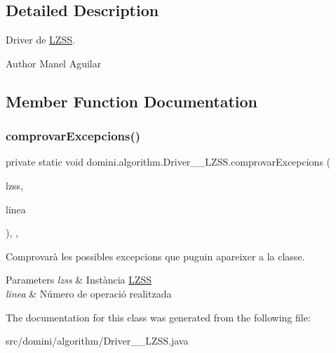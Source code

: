 \subsection{Detailed Description}
Driver de \hyperlink{classdomini_1_1algorithm_1_1LZSS}{L\+Z\+SS}. 

\begin{DoxyAuthor}{Author}
Manel Aguilar 
\end{DoxyAuthor}


\subsection{Member Function Documentation}
\mbox{\label{classdomini_1_1algorithm_1_1Driver____LZSS_a3b1983c6a71cd4d510e8434cd2e7f8f2}} 
\subsubsection{\texorpdfstring{comprovar\+Excepcions()}{comprovarExcepcions()}}
{\footnotesize\ttfamily private static void domini.\+algorithm.\+Driver\+\_\+\+\_\+\+L\+Z\+S\+S.\+comprovar\+Excepcions (\begin{DoxyParamCaption}\item[{\hyperlink{classdomini_1_1algorithm_1_1LZSS}{L\+Z\+SS}}]{lzss,  }\item[{String}]{linea }\end{DoxyParamCaption})\hspace{0.3cm}{\ttfamily [inline]}, {\ttfamily [static]}, {\ttfamily [private]}}



Comprovarà les possibles excepcions que puguin apareixer a la classe. 


\begin{DoxyParams}{Parameters}
{\em lzss} & Instància \hyperlink{classdomini_1_1algorithm_1_1LZSS}{L\+Z\+SS} \\
\hline
{\em linea} & Número de operació realitzada \\
\hline
\end{DoxyParams}


The documentation for this class was generated from the following file\+:\begin{DoxyCompactItemize}
\item 
src/domini/algorithm/Driver\+\_\+\+\_\+\+L\+Z\+S\+S.\+java\end{DoxyCompactItemize}
